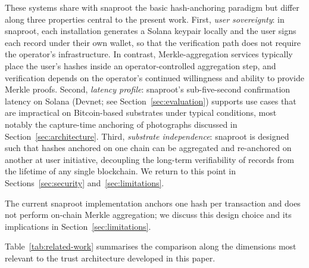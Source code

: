 \documentclass[11pt,a4paper]{article}
\begin{document}
These systems share with snaproot the basic hash-anchoring paradigm but
differ along three properties central to the present work. First,
\emph{user sovereignty}: in snaproot, each installation generates a
Solana keypair locally and the user signs each record under their own
wallet, so that the verification path does not require the operator's
infrastructure. In contrast, Merkle-aggregation services typically place
the user's hashes inside an operator-controlled aggregation step, and
verification depends on the operator's continued willingness and
ability to provide Merkle proofs. Second, \emph{latency profile}:
snaproot's sub-five-second confirmation latency on Solana (Devnet; see Section~\ref{sec:evaluation}) supports use cases that are impractical on Bitcoin-based substrates under typical conditions, most notably the capture-time anchoring of photographs discussed in
Section~\ref{sec:architecture}. Third, \emph{substrate independence}:
snaproot is designed such that hashes anchored on one chain can be
aggregated and re-anchored on another at user initiative, decoupling the
long-term verifiability of records from the lifetime of any single
blockchain. We return to this point in Sections~\ref{sec:security}
and~\ref{sec:limitations}.

The current snaproot implementation anchors one hash per transaction and
does not perform on-chain Merkle aggregation; we discuss this design
choice and its implications in Section~\ref{sec:limitations}.

Table~\ref{tab:related-work} summarises the comparison along the
dimensions most relevant to the trust architecture developed in this
paper.
\end{document}
